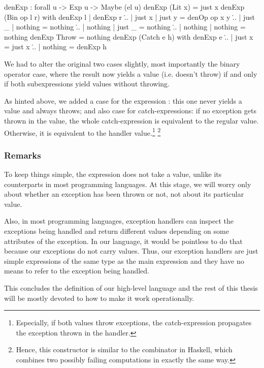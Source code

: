 \begin{code}
  denExp : forall {u} -> Exp u -> Maybe (el u)
  denExp (Lit x) = just x
  denExp (Bin op l r) with denExp l | denExp r
  \... | just x  | just y  = denOp op x y
  \... | just _  | nothing = nothing
  \... | nothing | just _  = nothing
  \... | nothing | nothing = nothing
  denExp Throw = nothing
  denExp (Catch e h) with denExp e
  \... | just x  = just x
  \... | nothing = denExp h 
\end{code}

\noindent We had to alter the original two cases slightly, most importantly the
binary operator case, where the result now yields a value (i.e.  doesn't throw)
if and only if both subexpressions yield values without throwing.

As hinted above, we added a case for the expression : this one
never yields a value and always throws; and also case for catch-expressions: if
no exception gets thrown in the value, the whole catch-expression is equivalent
to the regular value.  Otherwise, it is equivalent to the handler
value.\footnote{Especially, if both values throw exceptions, the
catch-expression propagates the exception thrown in the handler.}
\footnote{Hence, this constructor is similar to the combinator  in
Haskell, which combines two possibly failing computations in exactly the same
way.}

\subsubsection{Remarks}

To keep things simple, the  expression does not take a value,
unlike its counterparts in most programming languages. At this stage, we will
worry only about whether an exception has been thrown or not, not about its
particular value.

Also, in most programming languages, exception handlers can inspect the
exceptions being handled and return different values depending on some
attributes of the exception. In our language, it would be pointless to do that
because our exceptions do not carry values. Thus, our exception handlers are
just simple expressions of the same type as the main expression and they have
no means to refer to the exception being handled.

This concludes the definition of our high-level language and the rest of this thesis
will be mostly devoted to how to make it work operationally.

